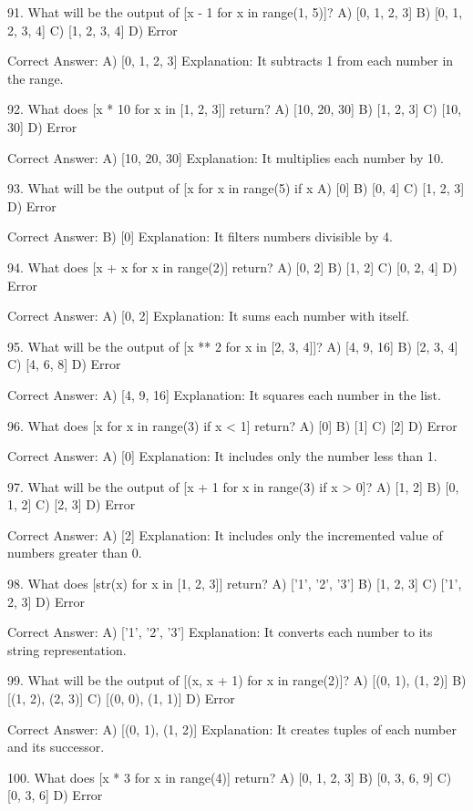 91. What will be the output of [x - 1 for x in range(1, 5)]?
A) [0, 1, 2, 3]
B) [0, 1, 2, 3, 4]
C) [1, 2, 3, 4]
D) Error

Correct Answer: A) [0, 1, 2, 3]
Explanation: It subtracts 1 from each number in the range.

92. What does [x * 10 for x in [1, 2, 3]] return?
A) [10, 20, 30]
B) [1, 2, 3]
C) [10, 30]
D) Error

Correct Answer: A) [10, 20, 30]
Explanation: It multiplies each number by 10.

93. What will be the output of [x for x in range(5) if x %
A) [0]
B) [0, 4]
C) [1, 2, 3]
D) Error

Correct Answer: B) [0]
Explanation: It filters numbers divisible by 4.

94. What does [x + x for x in range(2)] return?
A) [0, 2]
B) [1, 2]
C) [0, 2, 4]
D) Error

Correct Answer: A) [0, 2]
Explanation: It sums each number with itself.

95. What will be the output of [x ** 2 for x in [2, 3, 4]]?
A) [4, 9, 16]
B) [2, 3, 4]
C) [4, 6, 8]
D) Error

Correct Answer: A) [4, 9, 16]
Explanation: It squares each number in the list.

96. What does [x for x in range(3) if x < 1] return?
A) [0]
B) [1]
C) [2]
D) Error

Correct Answer: A) [0]
Explanation: It includes only the number less than 1.

97. What will be the output of [x + 1 for x in range(3) if x > 0]?
A) [1, 2]
B) [0, 1, 2]
C) [2, 3]
D) Error

Correct Answer: A) [2]
Explanation: It includes only the incremented value of numbers greater than 0.

98. What does [str(x) for x in [1, 2, 3]] return?
A) ['1', '2', '3']
B) [1, 2, 3]
C) ['1', 2, 3]
D) Error

Correct Answer: A) ['1', '2', '3']
Explanation: It converts each number to its string representation.

99. What will be the output of [(x, x + 1) for x in range(2)]?
A) [(0, 1), (1, 2)]
B) [(1, 2), (2, 3)]
C) [(0, 0), (1, 1)]
D) Error

Correct Answer: A) [(0, 1), (1, 2)]
Explanation: It creates tuples of each number and its successor.

100. What does [x * 3 for x in range(4)] return?
A) [0, 1, 2, 3]
B) [0, 3, 6, 9]
C) [0, 3, 6]
D) Error

